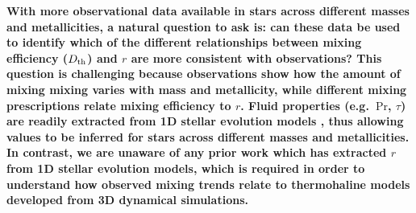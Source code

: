 \textbf{With more observational data available in stars across different masses and metallicities, a natural question to ask is: can these data be used to identify which of the different relationships between mixing efficiency ($D_\mathrm{th}$) and $r$ are more consistent with observations? This question is challenging because observations show how the amount of mixing mixing varies with mass and metallicity, while different mixing prescriptions relate mixing efficiency to $r$. Fluid properties (e.g.~$\mathrm{Pr}$, $\tau$) are readily extracted from 1D stellar evolution models \citep[e.g.][]{Jermyn_Anders_atlas}, thus allowing values to be inferred for stars across different masses and metallicities. 
In contrast, we are unaware of any prior work which has extracted $r$ from 1D stellar evolution models, which is required in order to understand how observed mixing trends relate to thermohaline models developed from 3D dynamical simulations. } %

